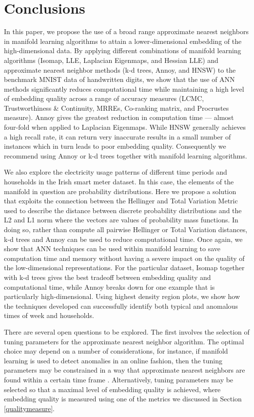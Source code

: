 \documentclass[11pt,a4paper,]{article}
\begin{document}
\hypertarget{conclusion}{%
\section{Conclusions}\label{conclusion}}

In this paper, we propose the use of a broad range approximate nearest neighbors in manifold learning algorithms to attain a lower-dimensional embedding of the high-dimensional data. By applying different combinations of manifold learning algorithms (Isomap, LLE, Laplacian Eigenmaps, and Hessian LLE) and approximate nearest neighbor methods (k-d trees, Annoy, and HNSW) to the benchmark MNIST data of handwritten digits, we show that the use of ANN methods significantly reduces computational time while maintaining a high level of embedding quality across a range of accuracy measures (LCMC, Trustworthiness \& Continuity, MRREs, Co-ranking matrix, and Procrustes measure). Annoy gives the greatest reduction in computation time --- almost four-fold when applied to Laplacian Eigenmaps. While HNSW generally achieves a high recall rate, it can return very inaccurate results in a small number of instances which in turn leads to poor embedding quality. Consequently we recommend using Annoy or k-d trees together with manifold learning algorithms.

We also explore the electricity usage patterns of different time periods and households in the Irish smart meter dataset. In this case, the elements of the manifold in question are probability distributions. Here we propose a solution that exploits the connection between the Hellinger and Total Variation Metric used to describe the distance between discrete probability distributions and the L2 and L1 norm where the vectors are values of probability mass functions. In doing so, rather than compute all pairwise Hellinger or Total Variation distances, k-d trees and Annoy can be used to reduce computational time.
Once again, we show that ANN techniques can be used within manifold learning to save computation time and memory without having a severe impact on the quality of the low-dimensional representations. For the particular dataset, Isomap together with k-d trees gives the best tradeoff between embedding quality and computational time, while Annoy breaks down for one example that is particularly high-dimensional. Using highest density region plots, we show how the techniques developed can successfully identify both typical and anomalous times of week and households.

There are several open questions to be explored. The first involves the selection of tuning parameters for the approximate nearest neighbor algorithm. The optimal choice may depend on a number of considerations, for instance, if manifold learning is used to detect anomalies in an online fashion, then the tuning parameters may be constrained in a way that approximate nearest neighbors are found within a certain time frame \autocite{Talagala2020}. Alternatively, tuning parameters may be selected so that a maximal level of embedding quality is achieved, where embedding quality is measured using one of the metrics we discussed in Section \ref{qualitymeasure}.
\end{document}
